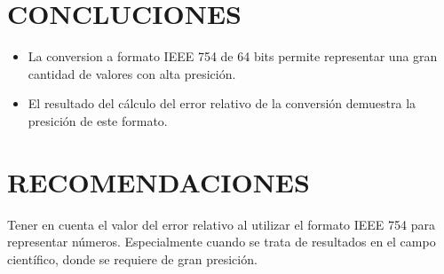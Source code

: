 \documentclass[12pt]{article}
\begin{document}
\section*{CONCLUCIONES}
\begin{itemize}
    \item {La conversion a formato IEEE 754 de 64 bits permite representar una gran cantidad de valores con alta presición.}
    \item {El resultado del cálculo del error relativo de la conversión demuestra la presición de este formato.} 
\end{itemize}

\section*{RECOMENDACIONES}

Tener en cuenta el valor del error relativo al utilizar el formato IEEE 754 para representar números.
Especialmente cuando se trata de resultados en el campo científico, donde se requiere de gran presición.
\renewcommand{\refname}{\MakeUppercase{REFERENCIAS}}


\end{document}
